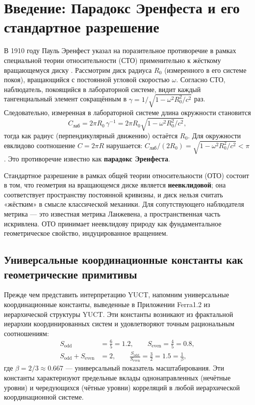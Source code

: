 \documentclass[12pt,a4paper]{article}
\newcommand{\betaf}{\beta}
\newcommand{\Sodd}{S_{\mathrm{odd}}}
\newcommand{\Seven}{S_{\mathrm{even}}}
\begin{document}
	\tableofcontents
	\newpage
	
	\section{Введение: Парадокс Эренфеста и его стандартное разрешение}
	\label{sec:intro}
	
	В 1910 году Пауль Эренфест указал на поразительное противоречие в рамках специальной теории относительности (СТО) применительно к жёсткому вращающемуся диску \cite{Ehrenfest1909}. Рассмотрим диск радиуса \(R_0\) (измеренного в его системе покоя), вращающийся с постоянной угловой скоростью \(\omega\). Согласно СТО, наблюдатель, покоящийся в лабораторной системе, видит каждый тангенциальный элемент сокращённым в \(\gamma = 1/\sqrt{1 - \omega^2 R_0^2/c^2}\) раз. Следовательно, измеренная в лабораторной системе длина окружности становится
	\[
	C_{\text{лаб}} = 2\pi R_0 \, \gamma^{-1} = 2\pi R_0 \sqrt{1 - \omega^2 R_0^2/c^2},
	\]
	тогда как радиус (перпендикулярный движению) остаётся \(R_0\). Для окружности евклидово соотношение \(C = 2\pi R\) нарушается: \(C_{\text{лаб}}/(2R_0) = \sqrt{1 - \omega^2 R_0^2/c^2} < \pi\). Это противоречие известно как \textbf{парадокс Эренфеста}.
	
	Стандартное разрешение в рамках общей теории относительности (ОТО) состоит в том, что геометрия на вращающемся диске является \textbf{неевклидовой}; она соответствует пространству постоянной кривизны, и диск нельзя считать «жёстким» в смысле классической механики. Для сопутствующего наблюдателя метрика — это известная метрика Ланжевена, а пространственная часть искривлена. ОТО принимает неевклидову природу как фундаментальное геометрическое свойство, индуцированное вращением.
	
	\subsection{Универсальные координационные константы как геометрические примитивы}
	
	Прежде чем представить интерпретацию YUCT, напомним универсальные координационные константы, выведенные в Приложении Ferra1.2 из иерархической структуры YUCT. Эти константы возникают из фрактальной иерархии координированных систем и удовлетворяют точным рациональным соотношениям:
	\begin{align}
		\Sodd &= \frac{6}{5} = 1.2, \qquad \Seven = \frac{4}{5} = 0.8, \\
		\Sodd + \Seven &= 2, \qquad \frac{\Sodd}{\Seven} = \frac{3}{2} = 1.5 = \frac{1}{\betaf},
	\end{align}
	где \(\betaf = 2/3 \approx 0.667\) — универсальный показатель масштабирования. Эти константы характеризуют предельные вклады однонаправленных (нечётные уровни) и чередующихся (чётные уровни) корреляций в любой иерархической координационной системе.
	
\end{document}
